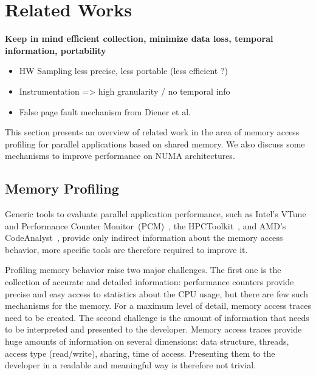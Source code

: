 
\section{Related Works}
\label{sec:related}

\textbf{Keep in mind efficient collection, minimize data loss, temporal
information, portability}
\begin{itemize}
    \item HW Sampling less precise, less portable (less efficient ?)
    \item Instrumentation => high granularity / no temporal info
    \item False page fault mechanism from Diener et al.
\end{itemize}

This section presents an overview of related work in the area of memory access
profiling for parallel applications based on shared memory.
We also discuss some mechanisms to improve performance on NUMA architectures.

\subsection{Memory Profiling}
\label{sec:related-profiling}

Generic tools to evaluate parallel application performance, such as Intel's
VTune~\cite{Reinders05VTune} and Performance Counter
Monitor~(PCM)~\cite{Intel2012b}, the HPCToolkit~\cite{Adhianto10HPCTOOLKIT},
and AMD's CodeAnalyst~\cite{Drongowski2008}, provide only indirect information
about the memory access behavior, more specific tools are therefore required to improve it.

Profiling memory behavior raise two major challenges.
The first one is the collection of accurate and detailed information: performance counters provide precise and easy access to statistics about the CPU usage, but there are few such mechanisms for the memory.
For a maximum level of detail, memory access traces need to be created.
The second challenge is the amount of information that needs to be interpreted and presented to the developer.
Memory access traces provide huge amounts of information on several
dimensions: data structure, threads, access type (read/write), sharing, time of access.
Presenting them to the developer in a readable and meaningful way is therefore not trivial.

